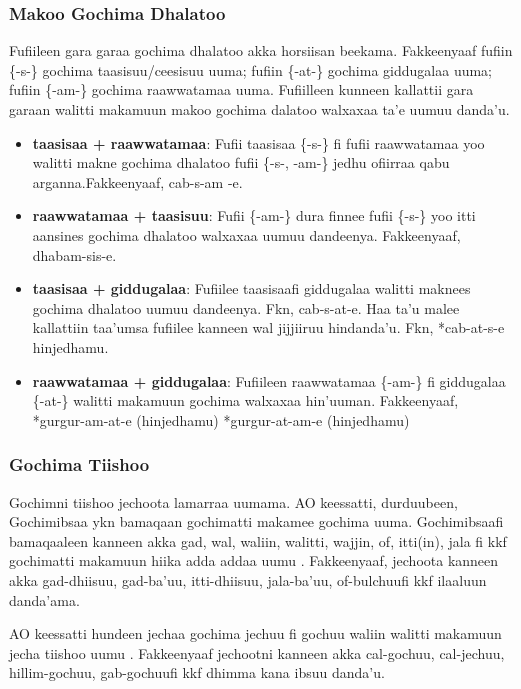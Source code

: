 \documentclass[11pt,b5paper]{book}
\begin{document}
\subsubsection{Makoo Gochima Dhalatoo}
Fufiileen gara garaa gochima dhalatoo akka horsiisan beekama. Fakkeenyaaf fufiin \{-s-\} gochima taasisuu/ceesisuu
uuma; fufiin \{-at-\} gochima giddugalaa uuma; fufiin \{-am-\} gochima raawwatamaa uuma. Fufiilleen kunneen kallattii gara garaan walitti makamuun makoo gochima dalatoo walxaxaa ta'e uumuu danda'u. 
\begin{itemize}
	\item \textbf{taasisaa + raawwatamaa}: Fufii taasisaa \{-s-\} fi fufii raawwatamaa yoo walitti makne gochima dhalatoo fufii \{-s-, -am-\} jedhu ofiirraa qabu arganna.Fakkeenyaaf, cab-s-am -e.
	\item \textbf{raawwatamaa + taasisuu}: Fufii \{-am-\} dura finnee fufii \{-s-\} yoo itti aansines gochima
	dhalatoo walxaxaa uumuu dandeenya. Fakkeenyaaf, dhabam-sis-e.
	\item \textbf{taasisaa + giddugalaa}: Fufiilee taasisaafi giddugalaa walitti maknees gochima 	dhalatoo uumuu dandeenya. Fkn, cab-s-at-e. Haa ta'u malee kallattiin taa'umsa fufiilee kanneen wal jijjiiruu hindanda’u. Fkn, *cab-at-s-e hinjedhamu. 
	\item  \textbf{raawwatamaa + giddugalaa}: Fufiileen raawwatamaa \{-am-\} fi giddugalaa \{-at-\} walitti makamuun gochima walxaxaa hin’uuman. Fakkeenyaaf, *gurgur-am-at-e (hinjedhamu)
	*gurgur-at-am-e (hinjedhamu)
\end{itemize}

\subsubsection{Gochima Tiishoo}
Gochimni tiishoo jechoota lamarraa uumama.  AO keessatti, durduubeen, Gochimibsaa ykn bamaqaan
gochimatti makamee gochima uuma. Gochimibsaafi bamaqaaleen kanneen akka gad, wal, waliin, walitti, wajjin, of, itti(in), jala fi kkf gochimatti makamuun hiika adda addaa uumu \cite[p.88]{griefenow2001grammatical}. Fakkeenyaaf, jechoota kanneen akka gad-dhiisuu, gad-ba'uu, itti-dhiisuu, jala-ba’uu, of-bulchuufi kkf ilaaluun danda'ama. 

AO keessatti hundeen jechaa gochima jechuu fi gochuu waliin walitti makamuun jecha tiishoo uumu \cite[p.89]{griefenow2001grammatical}. Fakkeenyaaf jechootni kanneen akka cal-gochuu, cal-jechuu, hillim-gochuu, gab-gochuufi kkf dhimma kana ibsuu danda'u.
\end{document}
